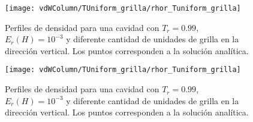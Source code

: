 \begin{figure}[ht]
	\centering
	\texttt{[image: vdWColumn/TUniform\_grilla/rhor\_Tuniform\_grilla]}
	\caption{Perfiles de densidad para una cavidad con $T_r = 0.99$, $E_r(H) = 10^{-3}$ y diferente cantidad de unidades de grilla en la direcci\'on vertical. Los puntos corresponden a la soluci\'on anal\'itica.}
	\label{fig:vdWColumn_b_eos}
\end{figure}

\begin{figure}[ht]
	\centering
	\texttt{[image: vdWColumn/TUniform\_grilla/rhor\_Tuniform\_grilla]}
	\caption{Perfiles de densidad para una cavidad con $T_r = 0.99$, $E_r(H) = 10^{-3}$ y diferente cantidad de unidades de grilla en la direcci\'on vertical. Los puntos corresponden a la soluci\'on anal\'itica.}
	\label{fig:vdWColumn_a_eos}
\end{figure}

